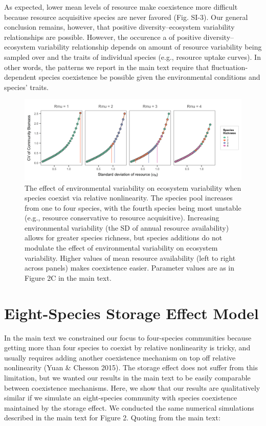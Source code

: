 \documentclass[11pt,]{article}
\begin{document}
As expected, lower mean levels of resource make coexistence more
difficult because resource acquisitive species are never favored (Fig.
SI-3). Our general conclusion remains, however, that positive
diversity--ecosystem variability relationships are possible. However,
the occurence a of positive diversity--ecosystem variability
relationship depends on amount of resource variability being sampled
over and the traits of individual species (e.g., resource uptake
curves). In other words, the patterns we report in the main text require
that fluctuation-dependent species coexistence be possible given the
environmental conditions and species' traits.

\begin{figure}[!ht]
  \centering
      \includegraphics[width=6in]{./components/SI_relative_nonlinearity_four_rmus.png}
  \caption{The effect of environmental variability on ecosystem variability when species coexist via relative nonlinearity. The species pool increases from one to four species, with the fourth species being most unstable (e.g., resource conservative to resource acquisitive). Increasing environmental variability (the SD of annual resource availability) allows for greater species richness, but species additions do not modulate the effect of environmental variability on ecosystem variability. Higher values of mean resource availability (left to right across panels) makes coexistence easier. Parameter values are as in Figure 2C in the main text.}
\end{figure}

\newpage{}

\section{Eight-Species Storage Effect Model}

In the main text we constrained our focus to four-species communities
because getting more than four species to coexist by relative
nonlinearity is tricky, and usually requires adding another coexistence
mechanism on top off relative nonlinearity (Yuan \& Chesson 2015). The
storage effect does not suffer from this limitation, but we wanted our
results in the main text to be easily comparable between coexistence
mechanisms. Here, we show that our results are qualitatively similar if
we simulate an eight-species community with species coexistence
maintained by the storage effect. We conducted the same numerical
simulations described in the main text for Figure 2. Quoting from the
main text:
\end{document}
